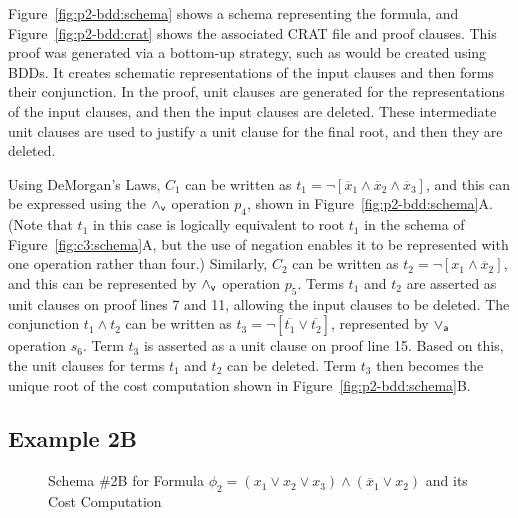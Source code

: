 \documentclass{llncs}
\newcommand{\pand}{\mathbin{\land_{\sf v}}}
\newcommand{\por}{\mathbin{\lor_{\sf a}}}
\newcommand{\obar}[1]{\overline{#1}}
\begin{document}
Figure~\ref{fig:p2-bdd:schema} shows a schema representing the formula,
and Figure~\ref{fig:p2-bdd:crat} shows the associated CRAT file and proof clauses.  This
proof was generated via a bottom-up strategy, such as would be created
using BDDs.  It creates schematic representations of the input
clauses and then forms their conjunction.  In the proof, unit
clauses are generated for the representations of the input clauses,
and then the input clauses are deleted.  These intermediate unit
clauses are used to justify a unit clause for the final root, and then
they are deleted.

Using DeMorgan's Laws, $C_1$ can be written as 
$t_1 = \neg [\obar{x}_1\land \obar{x}_2\land \obar{x}_3]$, and this can be
expressed using the $\pand$ operation $p_4$, shown in
Figure~\ref{fig:p2-bdd:schema}A\@.  (Note that $t_1$ in this case is
logically equivalent to root $t_1$ in the schema of
Figure~\ref{fig:c3:schema}A, but the use of negation enables it to be
represented with one operation rather than four.)  Similarly, $C_2$
can be written as $t_2 = \neg [x_1\land \obar{x}_2]$, and this can be
represented by $\pand$ operation $p_5$.
Terms $t_1$ and $t_2$ are asserted as unit clauses on proof lines 7 and 11,
allowing the input clauses to be deleted.
The conjunction $t_1 \land t_2$
can be written as $t_3 = \neg[\obar{t_1} \lor \obar{t_2}]$, represented by $\por$ operation $s_6$.
Term $t_3$ is asserted as a unit clause on proof line 15.
Based on this, the unit clauses for terms $t_1$ and
$t_2$ can be deleted.  Term $t_3$ then becomes the unique root of the cost
computation shown in Figure~\ref{fig:p2-bdd:schema}B\@.

\subsection{Example 2B}

\begin{figure}
\caption{Schema \#2B for Formula $\phi_2 = (x_1 \lor x_2 \lor x_3) \land (\obar{x}_1 \lor x_2)$ and its Cost Computation}
\label{fig:p2-cdcl:schema}
\end{figure}
\end{document}
